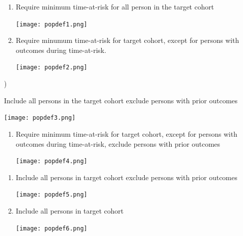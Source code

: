 \documentclass[
]{article}
\begin{document}
\begin{enumerate}
\def\labelenumi{\arabic{enumi})}
\item
  Require minimum time-at-risk for all person in the target cohort

  \texttt{[image: popdef1.png]}
\item
  Require minumum time-at-risk for target cohort, except for persons
  with outcomes during time-at-risk.

  \texttt{[image: popdef2.png]}
\end{enumerate}

)

Include all persons in the target cohort exclude persons with prior
outcomes

\texttt{[image: popdef3.png]}

\begin{enumerate}
\def\labelenumi{\arabic{enumi})}
\setcounter{enumi}{3}
\item
  Require minimum time-at-risk for target cohort, except for persons
  with outcomes during time-at-risk, exclude persons with prior outcomes

  \texttt{[image: popdef4.png]}
\end{enumerate}

\newpage

\begin{enumerate}
\def\labelenumi{\arabic{enumi})}
\setcounter{enumi}{4}
\item
  Include all persons in target cohort exclude persons with prior
  outcomes

  \texttt{[image: popdef5.png]}
\item
  Include all persons in target cohort

  \texttt{[image: popdef6.png]}
\end{enumerate}
\end{document}
